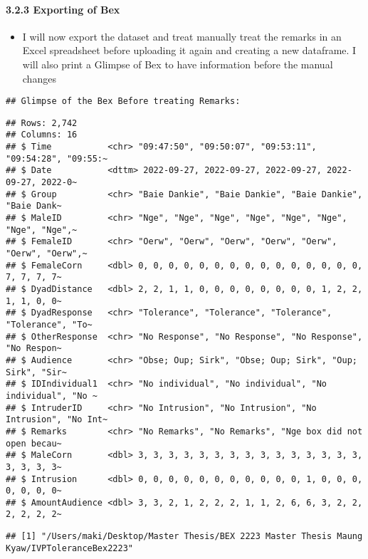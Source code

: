 \documentclass[
]{article}
\providecommand{\tightlist}{%
  \setlength{\itemsep}{0pt}\setlength{\parskip}{0pt}}
\begin{document}
\hypertarget{exporting-of-bex}{%
\paragraph{3.2.3 Exporting of Bex}\label{exporting-of-bex}}

\begin{itemize}
\tightlist
\item
  I will now export the dataset and treat manually treat the remarks in
  an Excel spreadsheet before uploading it again and creating a new
  dataframe. I will also print a Glimpse of Bex to have information
  before the manual changes
\end{itemize}

\begin{verbatim}
## Glimpse of the Bex Before treating Remarks:
\end{verbatim}

\begin{verbatim}
## Rows: 2,742
## Columns: 16
## $ Time           <chr> "09:47:50", "09:50:07", "09:53:11", "09:54:28", "09:55:~
## $ Date           <dttm> 2022-09-27, 2022-09-27, 2022-09-27, 2022-09-27, 2022-0~
## $ Group          <chr> "Baie Dankie", "Baie Dankie", "Baie Dankie", "Baie Dank~
## $ MaleID         <chr> "Nge", "Nge", "Nge", "Nge", "Nge", "Nge", "Nge", "Nge",~
## $ FemaleID       <chr> "Oerw", "Oerw", "Oerw", "Oerw", "Oerw", "Oerw", "Oerw",~
## $ FemaleCorn     <dbl> 0, 0, 0, 0, 0, 0, 0, 0, 0, 0, 0, 0, 0, 0, 0, 7, 7, 7, 7~
## $ DyadDistance   <dbl> 2, 2, 1, 1, 0, 0, 0, 0, 0, 0, 0, 0, 1, 2, 2, 1, 1, 0, 0~
## $ DyadResponse   <chr> "Tolerance", "Tolerance", "Tolerance", "Tolerance", "To~
## $ OtherResponse  <chr> "No Response", "No Response", "No Response", "No Respon~
## $ Audience       <chr> "Obse; Oup; Sirk", "Obse; Oup; Sirk", "Oup; Sirk", "Sir~
## $ IDIndividual1  <chr> "No individual", "No individual", "No individual", "No ~
## $ IntruderID     <chr> "No Intrusion", "No Intrusion", "No Intrusion", "No Int~
## $ Remarks        <chr> "No Remarks", "No Remarks", "Nge box did not open becau~
## $ MaleCorn       <dbl> 3, 3, 3, 3, 3, 3, 3, 3, 3, 3, 3, 3, 3, 3, 3, 3, 3, 3, 3~
## $ Intrusion      <dbl> 0, 0, 0, 0, 0, 0, 0, 0, 0, 0, 0, 1, 0, 0, 0, 0, 0, 0, 0~
## $ AmountAudience <dbl> 3, 3, 2, 1, 2, 2, 2, 1, 1, 2, 6, 6, 3, 2, 2, 2, 2, 2, 2~
\end{verbatim}

\begin{verbatim}
## [1] "/Users/maki/Desktop/Master Thesis/BEX 2223 Master Thesis Maung Kyaw/IVPToleranceBex2223"
\end{verbatim}
\end{document}
